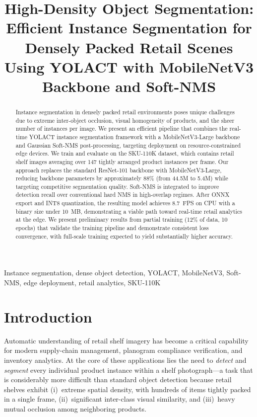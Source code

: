 \documentclass[conference]{IEEEtran}
\title{High-Density Object Segmentation: Efficient Instance Segmentation
       for Densely Packed Retail Scenes Using YOLACT with MobileNetV3
       Backbone and Soft-NMS}
\author{
  \IEEEauthorblockN{Raman Luhach}
  \IEEEauthorblockA{
    Enrollment No: 230107\\
    Department of Computer Science
  }
  \and
  \IEEEauthorblockN{Rachit Kumar}
  \IEEEauthorblockA{
    Enrollment No: 230128\\
    Department of Computer Science
  }
}
\begin{document}
\maketitle

\begin{abstract}
Instance segmentation in densely packed retail environments poses unique
challenges due to extreme inter-object occlusion, visual homogeneity of
products, and the sheer number of instances per image. We present an
efficient pipeline that combines the real-time YOLACT instance segmentation
framework with a MobileNetV3-Large backbone and Gaussian Soft-NMS
post-processing, targeting deployment on resource-constrained edge
devices. We train and evaluate on the SKU-110K dataset, which contains
retail shelf images averaging over 147 tightly arranged product instances
per frame. Our approach replaces the standard ResNet-101 backbone with
MobileNetV3-Large, reducing backbone parameters by approximately
88\% (from 44.5M to 5.4M) while targeting competitive segmentation
quality. Soft-NMS is integrated to improve detection recall over
conventional hard NMS in high-overlap regimes. After ONNX export and
INT8 quantization, the resulting model achieves 8.7~FPS on CPU with a
binary size under 10~MB, demonstrating a viable path toward real-time
retail analytics at the edge. We present preliminary results from
partial training (12\% of data, 10 epochs) that validate the training
pipeline and demonstrate consistent loss convergence, with full-scale
training expected to yield substantially higher accuracy.
\end{abstract}

\begin{IEEEkeywords}
Instance segmentation, dense object detection, YOLACT, MobileNetV3,
Soft-NMS, edge deployment, retail analytics, SKU-110K
\end{IEEEkeywords}

\section{Introduction}
\label{sec:intro}

Automatic understanding of retail shelf imagery has become a critical
capability for modern supply-chain management, planogram compliance
verification, and inventory analytics. At the core of these applications
lies the need to \emph{detect} and \emph{segment} every individual product
instance within a shelf photograph---a task that is considerably more
difficult than standard object detection because retail shelves exhibit
(i)~extreme spatial density, with hundreds of items tightly packed in a
single frame, (ii)~significant inter-class visual similarity, and
(iii)~heavy mutual occlusion among neighboring products.
\end{document}
